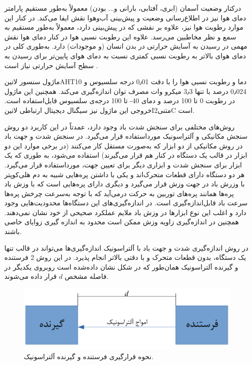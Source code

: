 
درکتار وضعیت آسمان (ابری، آفتابی، بارانی و... بودن) معمولاً به‌طور مستقیم پارامتر دمای هوا نیز در اطلاع‌رسانی وضعیت و پیش‌بینی آب‌وهوا نقش ایفا می‌کند. در کنار این موارد رطوبت هوا نیز، علاوه بر نقشی که در پیش‌بینی دارد، معمولاً به‌طور مستقیم به سمع و نظر مخاطبین می‌رسد. علاوه این رطوبت نسبی هوا در کنار دمای هوا نقش مهمی در رسیدن به آسایش حرارتی در بدن انسان (و موجودات) دارد. به‌طوری کلی در دمای هوای بالاتر به رطوبت نسبی کمتری نسبت به دمای هوای پایین‌تر برای رسیدن به سطح آسایش  حرارتی نیاز است . 

ماژول سنسور ‌لاتین{AHT10} دما و رطوبت نسبی هوا را با دقت 0٫01 درجه سلسیوس و 0٫024 درصد با تنها 3٫3 میکرو وات مصرف توان اندازه‌گیری می‌کند. همچنین این ماژول در رطوبت 0 تا 100 درصد و دمای  40- تا 100 درجه‌ی سلسیوس قابل‌استفاده است. خروجی این ماژول نیز سیگنال دیجیتال ارتباطی ‌لاتین{I‌متنی{2}C} است. 


روش‌های مختلفی برای سنجش شدت باد وجود دارد، عمدتاً در این کاربرد دو روش سنجش مکانیکی و آلتراسونیک  مورداستفاده قرار می‌گیرد. در سنجش شدت و جهت باد در روش مکانیکی از دو ابزار که به‌صورت مستقل کار می‌کنند (در برخی موارد این دو ابزار در قالب یک دستگاه در کنار هم قرار می‌گیرند) استفاده می‌شود، به طوری که یک ابزار برای سنجش شدت و ابزاری دیگر برای تعیین جهت، مورداستفاده قرار می‌گیرد. هر دو دستگاه دارای قطعات متحرک‌اند و یکی با داشتن پره‌هایی شبیه به دم هلی‌کوپتر با وزرش باد در جهت وزش قرار می‌گیرد و دیگری دارای پره‌هایی است که با وزش باد پره‌ها همانند پره‌های توربین به حرکت درمی‌آید که با توجه به‌سرعت چرخش پره‌ها سرعت باد قابل‌اندازه‌گیری است. در اندازه‌گیری‌های این دستگاه‌ها محدودیت‌هایی وجود دارد و اغلب این نوع ابزارها در وزش باد ملایم عملکرد صحیحی از خود نشان نمی‌دهند. همچنین در اندازه‌گیری زاویه وزش ممکن‌ است محدود به اندازه گیری زوایای خاصی باشند. 

در روش اندازه‌گیری شدت و جهت باد با آلتراسونیک اندازه‌گیری‌ها می‌تواند در قالب تنها یک دستگاه، بدون قطعات متحرک و با دقتی بالاتر انجام پذیرد. در این روش 2 فرستنده و گیرنده آلتراسونیک همان‌طور که در شکل  نشان داده‌شده است روبروی یکدیگر در فاصله مشخص $d$ قرار داده می‌شوند.

\begin{figure}[!h]
	\centering
	\includegraphics[width=0.6\linewidth]{Assets/ultrasonic one axis.pdf}
	\caption{نحوه قرارگیری فرستنده و گیرنده آلتراسونیک.}
	\label{fig:oneAxisUltrasonic}
\end{figure}

